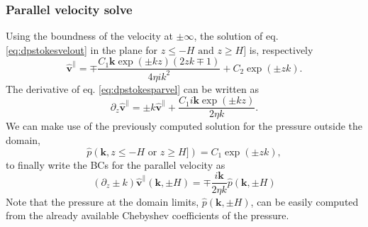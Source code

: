 \documentclass[ twoside,openright,titlepage,numbers=noenddot,%
headinclude,footinclude,cleardoublepage=empty,abstract=on,
BCOR=5mm,paper=a4,fontsize=11pt, dvipsnames
]{scrreprt}
\renewcommand{\vec}[1]{\bm{#1}}
\newcommand{\fou}[1]{\widehat{#1}}
\newcommand{\fvel}{v}
\begin{document}
\subsubsection*{Parallel velocity solve}
Using the boundness of the velocity at $\pm\infty$, the solution of eq. \eqref{eq:dpstokesvelout} in the plane for $z \le -H \text{ and } z\ge H]$ is, respectively
\begin{equation}
  \label{eq:dpstokesparvel}
  \fou{\vec{\fvel}}^{\parallel} = \mp\frac{C_1\vec{k}\exp(\pm kz)\left(2zk\mp 1\right)}{4\eta ik^2} + C_2\exp(\pm zk).
\end{equation}
The derivative of eq. \eqref{eq:dpstokesparvel} can be written as
\begin{equation}
  \label{eq:dpstokesparvelder}
  \partial_z\fou{\vec{\fvel}}^{\parallel} = \pm k\fou{\vec{\fvel}}^{\parallel} + \frac{C_1i\vec{k}\exp(\pm kz)}{2\eta k}.
\end{equation}
We can make use of the previously computed solution for the pressure outside the domain,
\begin{equation}
  \label{eq:dpstokespresout}
\fou{p}(\vec{k}, z \le -H \text{ or } z\ge H]) = C_1\exp\left(\pm zk\right),
\end{equation}
to finally write the \glspl{BC} for the parallel velocity as
\begin{equation}
  \label{eq:dpstokesparvelbc}
  \left(\partial_z\pm k\right)\fou{\vec{\fvel}}^\parallel(\vec{k}, \pm H) = \mp \frac{i\vec{k}}{2\eta k}\fou{p}(\vec{k}, \pm H)
\end{equation}
Note that the pressure at the domain limits, $\fou{p}(\vec{k}, \pm H)$, can be easily computed from the already available Chebyshev coefficients of the pressure.
\end{document}
